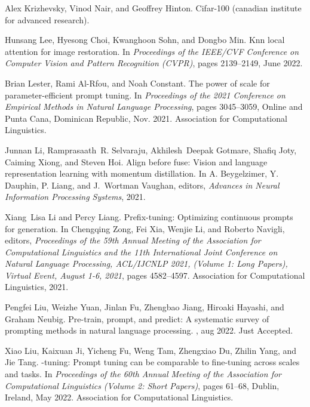 \documentclass[10pt,twocolumn,letterpaper]{article}
\begin{document}
{\begin{thebibliography}{10}
Alex Krizhevsky, Vinod Nair, and Geoffrey Hinton.
\newblock Cifar-100 (canadian institute for advanced research).

Hunsang Lee, Hyesong Choi, Kwanghoon Sohn, and Dongbo Min.
\newblock Knn local attention for image restoration.
\newblock In {\em Proceedings of the IEEE/CVF Conference on Computer Vision and
  Pattern Recognition (CVPR)}, pages 2139--2149, June 2022.

Brian Lester, Rami Al-Rfou, and Noah Constant.
\newblock The power of scale for parameter-efficient prompt tuning.
\newblock In {\em Proceedings of the 2021 Conference on Empirical Methods in
  Natural Language Processing}, pages 3045--3059, Online and Punta Cana,
  Dominican Republic, Nov. 2021. Association for Computational Linguistics.

Junnan Li, Ramprasaath~R. Selvaraju, Akhilesh~Deepak Gotmare, Shafiq Joty,
  Caiming Xiong, and Steven Hoi.
\newblock Align before fuse: Vision and language representation learning with
  momentum distillation.
\newblock In A. Beygelzimer, Y. Dauphin, P. Liang, and J.~Wortman Vaughan,
  editors, {\em Advances in Neural Information Processing Systems}, 2021.

Xiang~Lisa Li and Percy Liang.
\newblock Prefix-tuning: Optimizing continuous prompts for generation.
\newblock In Chengqing Zong, Fei Xia, Wenjie Li, and Roberto Navigli, editors,
  {\em Proceedings of the 59th Annual Meeting of the Association for
  Computational Linguistics and the 11th International Joint Conference on
  Natural Language Processing, {ACL/IJCNLP} 2021, (Volume 1: Long Papers),
  Virtual Event, August 1-6, 2021}, pages 4582--4597. Association for
  Computational Linguistics, 2021.

Pengfei Liu, Weizhe Yuan, Jinlan Fu, Zhengbao Jiang, Hiroaki Hayashi, and
  Graham Neubig.
\newblock Pre-train, prompt, and predict: A systematic survey of prompting
  methods in natural language processing.
, aug 2022.
\newblock Just Accepted.

Xiao Liu, Kaixuan Ji, Yicheng Fu, Weng Tam, Zhengxiao Du, Zhilin Yang, and Jie
  Tang.
-tuning: Prompt tuning can be comparable to fine-tuning across
  scales and tasks.
\newblock In {\em Proceedings of the 60th Annual Meeting of the Association for
  Computational Linguistics (Volume 2: Short Papers)}, pages 61--68, Dublin,
  Ireland, May 2022. Association for Computational Linguistics.


\end{thebibliography}}
\end{document}
